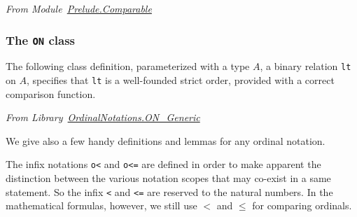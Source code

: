 \emph{From Module~\href{../theories/html/hydras.Prelude/mparable.html\#Hvariant}{Prelude.Comparable}}

\label{sect:comparable-def}







\subsubsection{The \texttt{ON} class}

The following class definition, parameterized with a type $A$, a binary relation \texttt{lt} on $A$, specifies that \texttt{lt} is a well-founded strict order, provided with a correct comparison function.


\vspace{4pt}
\noindent\emph{From
Library~\href{../theories/html/hydras.OrdinalNotations.ON_Generic.html}{OrdinalNotations.ON\_Generic}}

\label{types:ON}




We give  also a few handy definitions and lemmas for any ordinal notation.

\label{sect:on-lt-notation}
\label{sect:on-le-notation}
\label{sect:measure-ON}
\label{sect:bigO-ON}







\begin{remark}
The infix notations \texttt{o<} and \texttt{o<=} are defined in order to make apparent the distinction between the various notation scopes that may co-exist in a same statement. So the infix \texttt{<} and \texttt{<=} are reserved to the natural numbers. In the mathematical formulas, however, we still use $<$ and $\leq$ for comparing ordinals.
\end{remark}




